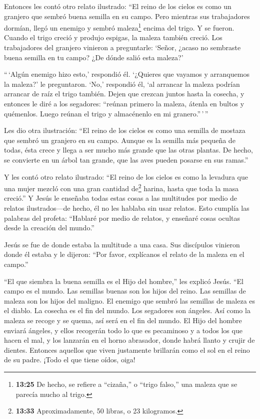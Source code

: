  Entonces les contó otro relato ilustrado: ``El reino de
los cielos es como un granjero que sembró buena semilla en su campo.
 Pero mientras sus trabajadores dormían, llegó un enemigo y
sembró maleza\footnote{\textbf{13:25} De hecho, se refiere a ``cizaña,''
  o ``trigo falso,'' una maleza que se parecía mucho al trigo.} encima
del trigo. Y se fueron.  Cuando el trigo creció y produjo
espigas, la maleza también creció.  Los trabajadores del
granjero vinieron a preguntarle: `Señor, ¿acaso no sembraste buena
semilla en tu campo? ¿De dónde salió esta maleza?'

 ``\,`Algún enemigo hizo esto,' respondió él. `¿Quieres que
vayamos y arranquemos la maleza?' le preguntaron.  `No,'
respondió él, `al arrancar la maleza podrían arrancar de raíz el trigo
también.  Dejen que crezcan juntos hasta la cosecha, y
entonces le diré a los segadores: ``reúnan primero la maleza, átenla en
bultos y quémenlos. Luego reúnan el trigo y almacénenlo en mi
granero.''\,'\,''

 Les dio otra ilustración: ``El reino de los cielos es como
una semilla de mostaza que sembró un granjero en su campo. 
Aunque es la semilla más pequeña de todas, ésta crece y llega a ser
mucho más grande que las otras plantas. De hecho, se convierte en un
árbol tan grande, que las aves pueden posarse en sus ramas.''

 Y les contó otro relato ilustrado: ``El reino de los
cielos es como la levadura que una mujer mezcló con una gran cantidad
de\footnote{\textbf{13:33} Aproximadamente, 50 libras, o 23 kilogramos.}
harina, hasta que toda la masa creció.''  Y Jesús le
enseñaba todas estas cosas a las multitudes por medio de relatos
ilustrados---de hecho, él no les hablaba sin usar relatos. 
Esto cumplía las palabras del profeta: ``Hablaré por medio de relatos, y
enseñaré cosas ocultas desde la creación del mundo.''

 Jesús se fue de donde estaba la multitude a una casa. Sus
discípulos vinieron donde él estaba y le dijeron: ``Por favor,
explícanos el relato de la maleza en el campo.''

 ``El que siembra la buena semilla es el Hijo del hombre,''
les explicó Jesús.  ``El campo es el mundo. Las semillas
buenas son los hijos del reino. Las semillas de maleza son los hijos del
maligno.  El enemigo que sembró las semillas de maleza es
el diablo. La cosecha es el fin del mundo. Los segadores son ángeles.
 Así como la maleza se recoge y se quema, así será en el
fin del mundo.  El Hijo del hombre enviará ángeles, y ellos
recogerán todo lo que es pecaminoso y a todos los que hacen el mal,
 y los lanzarán en el horno abrasador, donde habrá llanto y
crujir de dientes.  Entonces aquellos que viven justamente
brillarán como el sol en el reino de su padre. ¡Todo el que tiene oídos,
oiga!

